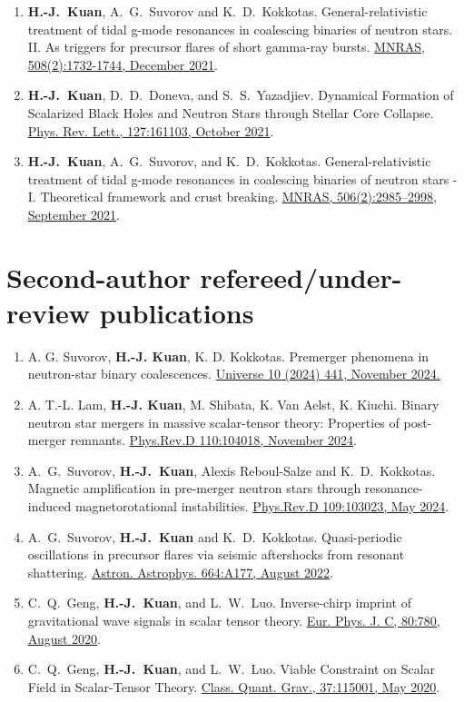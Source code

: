 \documentclass[10pt,floatfix,a4paper]{article}
\begin{document}
\begin{enumerate}
	\item  \textbf{H.-J.~Kuan}, A.~G.~Suvorov and K.~D.~Kokkotas. General-relativistic treatment of tidal g-mode resonances in coalescing binaries of neutron stars. II. As triggers for precursor flares of short gamma-ray bursts. \href{https://doi.org/10.1093/mnras/stab2658}{MNRAS, 508(2):1732-1744, December 2021}.
	\item \textbf{H.-J.~Kuan}, D.~D.~Doneva, and S.~S.~Yazadjiev. Dynamical Formation of Scalarized Black Holes and Neutron Stars through Stellar Core Collapse. \href{https://doi.org/10.1103/PhysRevLett.127.161103}{Phys. Rev. Lett., 127:161103, October 2021}.
	\item \textbf{H.-J.~Kuan}, A.~G.~Suvorov, and K.~D.~Kokkotas. General-relativistic treatment of tidal g-mode resonances in coalescing binaries of neutron stars - I. Theoretical framework and crust breaking. \href{https://doi.org/10.1093/mnras/stab1898}{MNRAS, 506(2):2985–2998, September 2021}.
\end{enumerate}



\section*{Second-author refereed/under-review publications}
\begin{enumerate}
	\item A. G. Suvorov, \textbf{H.-J. Kuan}, K. D. Kokkotas. Premerger phenomena in neutron-star binary coalescences. \href{https://www.mdpi.com/2218-1997/10/12/441}{Universe 10 (2024) 441, November 2024.}
	\item A. T.-L. Lam, \textbf{H.-J. Kuan}, M. Shibata, K. Van Aelst, K. Kiuchi. Binary neutron star mergers in massive scalar-tensor theory: Properties of post-merger remnants. \href{https://journals.aps.org/prd/abstract/10.1103/PhysRevD.110.104018}{Phys.Rev.D 110:104018, November 2024}.
	\item A.~G.~Suvorov, \textbf{H.-J.~Kuan}, Alexis Reboul-Salze and K.~D.~Kokkotas. Magnetic amplification in pre-merger neutron stars through resonance-induced magnetorotational instabilities.  \href{https://journals.aps.org/prd/abstract/10.1103/PhysRevD.109.103023}{Phys.Rev.D 109:103023, May 2024}.
	\item A.~G.~Suvorov, \textbf{H.-J.~Kuan} and K.~D.~Kokkotas. Quasi-periodic oscillations in precursor flares via seismic aftershocks from resonant shattering. \href{https://www.aanda.org/articles/aa/full_html/2022/08/aa44082-22/aa44082-22.html}{Astron. Astrophys. 664:A177, August 2022}.
	\item C.~Q.~Geng, \textbf{H.-J.~Kuan}, and L.~W.~Luo. Inverse-chirp imprint of gravitational wave signals in scalar tensor theory. \href{https://doi.org/10.1140/epjc/s10052-020-8359-y}{Eur. Phys. J. C, 80:780, August 2020}.
	\item C.~Q.~Geng, \textbf{H.-J.~Kuan}, and L.~W.~Luo. Viable Constraint on Scalar Field in Scalar-Tensor Theory.	\href{https://doi.org/10.1088/1361-6382/ab86fb}{Class. Quant. Grav., 37:115001, May 2020}.
\end{enumerate}
\end{document}
